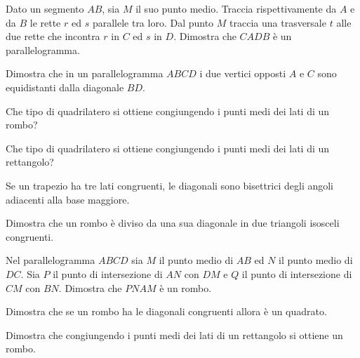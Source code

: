 \begin{multicols}{2}
\begin{esercizio}
	\label{ese:4.18}
	Dato un segmento \(AB\), sia \(M\) il suo punto medio. Traccia 
	rispettivamente da \(A\) e da \(B\) le rette \(r\) ed \(s\) parallele tra 
	loro. Dal punto \(M\) traccia una trasversale \(t\) alle due rette che 
	incontra \(r\) in \(C\) ed \(s\) in \(D\). Dimostra che \(CADB\) è un 
	parallelogramma.
\end{esercizio}

\begin{esercizio}
	\label{ese:4.19}
	Dimostra che in un parallelogramma \(ABCD\) i due vertici opposti \(A\) e 
	\(C\) sono equidistanti dalla diagonale \(BD\).
\end{esercizio}

\begin{esercizio}
	\label{ese:4.50}
	Che tipo di quadrilatero si ottiene congiungendo i punti medi dei 
	lati di un rombo?
\end{esercizio}

\begin{esercizio}
	\label{ese:4.51}
	Che tipo di quadrilatero si ottiene congiungendo i punti medi dei 
	lati di un rettangolo?
\end{esercizio}

\begin{esercizio}
\label{ese:4.8}
Se un trapezio ha tre lati congruenti, le diagonali sono bisettrici 
degli angoli adiacenti alla base maggiore.
\end{esercizio}

\begin{esercizio}
\label{ese:4.9}
Dimostra che un rombo è diviso da una sua diagonale in due triangoli 
isosceli congruenti.
\end{esercizio}

\begin{esercizio}
\label{ese:4.21}
Nel parallelogramma \(ABCD\) sia \(M\) il punto medio di \(AB\) ed \(N\) il 
punto medio di \(DC\). Sia \(P\) il punto di intersezione di \(AN\) con 
\(DM\) e \(Q\) il punto di intersezione di \(CM\) con \(BN\). Dimostra che 
\(PNAM\) è un rombo.
\end{esercizio}

\begin{esercizio}
\label{ese:4.22}
Dimostra che se un rombo ha le diagonali congruenti allora è un 
quadrato.
\end{esercizio}

\begin{esercizio}
\label{ese:4.23}
Dimostra che congiungendo i punti medi dei lati di un rettangolo si 
ottiene un rombo.
\end{esercizio}


\end{multicols}
